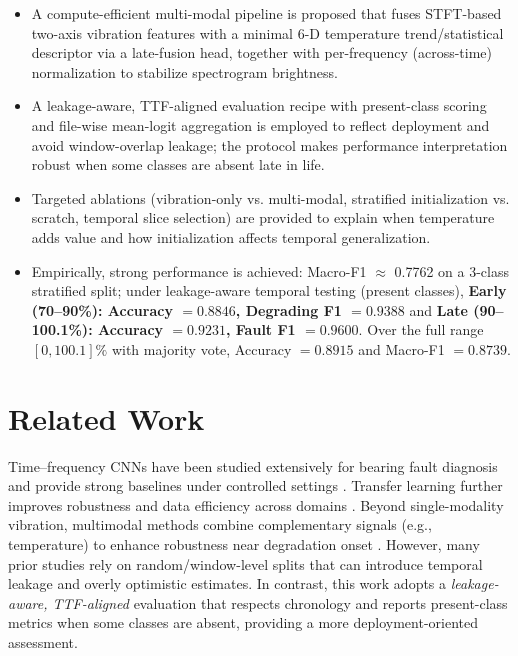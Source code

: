\documentclass[pdflatex,sn-mathphys-num]{sn-jnl}%
\begin{document}
\begin{itemize}
    \item A compute-efficient multi-modal pipeline is proposed that fuses STFT-based two-axis vibration features with a minimal 6-D temperature trend/statistical descriptor via a late-fusion head, together with per-frequency (across-time) normalization to stabilize spectrogram brightness.
    \item A leakage-aware, TTF-aligned evaluation recipe with present-class scoring and file-wise mean-logit aggregation is employed to reflect deployment and avoid window-overlap leakage; the protocol makes performance interpretation robust when some classes are absent late in life.
    \item Targeted ablations (vibration-only vs. multi-modal, stratified initialization vs. scratch, temporal slice selection) are provided to explain when temperature adds value and how initialization affects temporal generalization.
    \item Empirically, strong performance is achieved: Macro-F1 $\approx$ 0.7762 on a 3-class stratified split; under leakage-aware temporal testing (present classes), \textbf{Early (70--90\%): Accuracy $=0.8846$, Degrading F1 $=0.9388$} and \textbf{Late (90--100.1\%): Accuracy $=0.9231$, Fault F1 $=0.9600$}. Over the full range $[0,100.1]\%$ with majority vote, Accuracy $=0.8915$ and Macro-F1 $=0.8739$.
\end{itemize}

\section{Related Work}
Time--frequency CNNs have been studied extensively for bearing fault diagnosis and provide strong baselines under controlled settings \cite{zhao2019deep,lei2020roadmap,ince2016tie,wen2018neurocomputing}. Transfer learning further improves robustness and data efficiency across domains \cite{shao2019tii_transfer}. Beyond single-modality vibration, multimodal methods combine complementary signals (e.g., temperature) to enhance robustness near degradation onset \cite{baltrusaitis2019multimodal,huo2022tim_multisensor,gao2024inffus_multisource,xiao2025inffus_multilevel}. However, many prior studies rely on random/window-level splits that can introduce temporal leakage and overly optimistic estimates. In contrast, this work adopts a \emph{leakage-aware, TTF-aligned} evaluation that respects chronology and reports present-class metrics when some classes are absent, providing a more deployment-oriented assessment.
\end{document}
